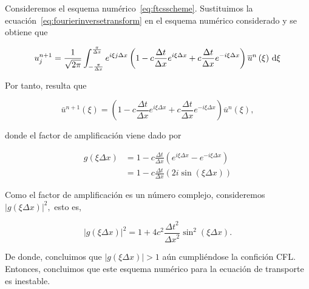 \begin{example}
  Consideremos el esquema numérico~\eqref{eq:ftcsscheme}.
  Sustituimos la ecuación~\eqref{eq:fourierinversetransform} en el
  esquema numérico considerado y se obtiene que

  \begin{equation*}
    u^{n+1}_{j}=
    \frac{1}{\sqrt{2\pi}}
    \int_{-\frac{\pi}{\Delta x}}^{\frac{\pi}{\Delta x}}
    e^{i\xi j \Delta x}
    \left(
    1-c\frac{\Delta t}{\Delta x}
    e^{i \xi \Delta x}+
    c\frac{\Delta t}{\Delta x}
    e^{-i\xi\Delta x}\right)
    \overline{u}^{n}
    \left(\xi\right)
    \dl\xi
  \end{equation*}

  Por tanto, resulta que

  \begin{equation*}
    \bar{u}^{n+1}
    \left(\xi\right)=
    \left(
    1-
    c\frac{\Delta t}{\Delta x}
    e^{i\xi\Delta x}+
    c\frac{\Delta t}{\Delta x}
    e^{-i\xi\Delta x}
    \right)
    \overline{u}^{n}
    \left(\xi\right),
  \end{equation*}

  donde el factor de amplificación viene dado por

  \begin{align*}
    g
    \left(\xi\Delta x\right) & =
    1-
    c\frac{\Delta t}{\Delta x}
    \left(
    e^{i\xi\Delta x}-
    e^{-i\xi\Delta x}
    \right)                      \\
                             & =
    1-
    c\frac{\Delta t}{\Delta x}
    \left(
    2i\sin
    \left(\xi\Delta x\right)
    \right)
  \end{align*}

  Como el factor de amplificación es un número complejo, consideremos
  \begin{math}
    {\left|
      g\left(\xi\Delta x\right)
      \right|}^{2},
  \end{math}
  esto es,

  \begin{equation*}
    \left|
    g
    \left(\xi\Delta x\right)
    \right|^{2}=
    1+
    4c^{2}
    \frac{{\Delta t}^{2}}{{\Delta x}^{2}}
    \sin^{2}
    \left(\xi\Delta x\right).
  \end{equation*}

  De donde, concluimos que
  \begin{math}
    \left|
    g\left(\xi\Delta x\right)
    \right|>
    1
  \end{math}
  aún cumpliéndose la confición CFL.
  Entonces, concluimos que este esquema numérico para la ecuación de
  transporte es inestable.
\end{example}


